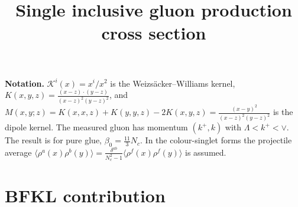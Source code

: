 \documentclass[9pt]{article}
\title{Single inclusive gluon production cross section}
\author{}
\date{}
\numberwithin{equation}{section}
\begin{document}
\maketitle
\noindent\textbf{Notation.} $\mathcal{K}^{i}(x)=x^{i}/x^{2}$ is the Weizs\"acker--Williams kernel,
$K(x,y,z)=\frac{(x-z)\cdot(y-z)}{(x-z)^{2}(y-z)^{2}}$, and $M(x,y;z)=K(x,x,z)+K(y,y,z)-2K(x,y,z)=\frac{(x-y)^{2}}{(x-z)^{2}(y-z)^{2}}$ is the dipole kernel.
The measured gluon has momentum $(k^{+},k)$ with $\Lambda<k^{+}<\vee$. The result is for pure glue, $\beta_{0}=\tfrac{11}{3}N_{c}$.
In the colour-singlet forms the projectile average $\langle\rho^{a}(x)\rho^{b}(y)\rangle=\frac{\delta^{ab}}{N_{c}^{2}-1}\langle\rho^{f}(x)\rho^{f}(y)\rangle$ is assumed.
\section{BFKL contribution}
\end{document}
